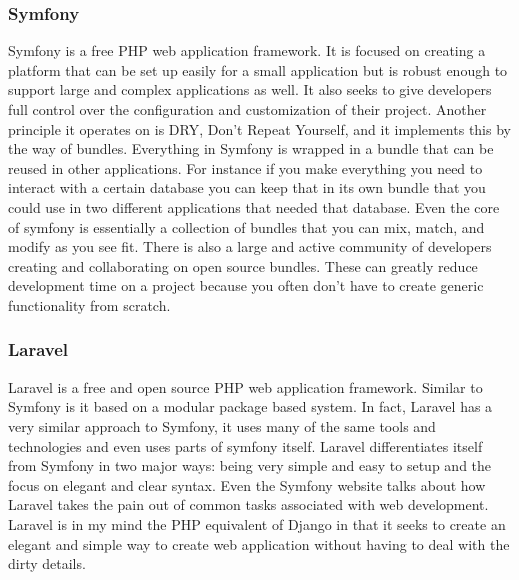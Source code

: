 \subsubsection{Symfony}
Symfony is a free PHP web application framework. 
It is focused on creating a platform that can be set up easily for a small application but is robust enough to support large and complex applications as well. 
It also seeks to give developers full control over the configuration and customization of their project. 
Another principle it operates on is DRY, Don’t Repeat Yourself, and it implements this by the way of bundles. 
Everything in Symfony is wrapped in a bundle that can be reused in other applications. 
For instance if you make everything you need to interact with a certain database you can keep that in its own bundle that you could use in two different applications that needed that database. 
Even the core of symfony is essentially a collection of bundles that you can mix, match, and modify as you see fit. 
There is also a large and active community of developers creating and collaborating on open source bundles. 
These can greatly reduce development time on a project because you often don’t have to create generic functionality from scratch.

\subsubsection{Laravel}
Laravel is a free and open source PHP web application framework. 
Similar to Symfony is it based on a modular package based system. 
In fact, Laravel has a very similar approach to Symfony, it uses many of the same tools and technologies and even uses parts of symfony itself. 
 Laravel differentiates itself from Symfony in two major ways: being very simple and easy to setup and the focus on elegant and clear syntax. 
 Even the Symfony website talks about how Laravel takes the pain out of common tasks associated with web development. 
Laravel is in my mind the PHP equivalent of Django in that it seeks to create an elegant and simple way to create web application without having to deal with the dirty details.

